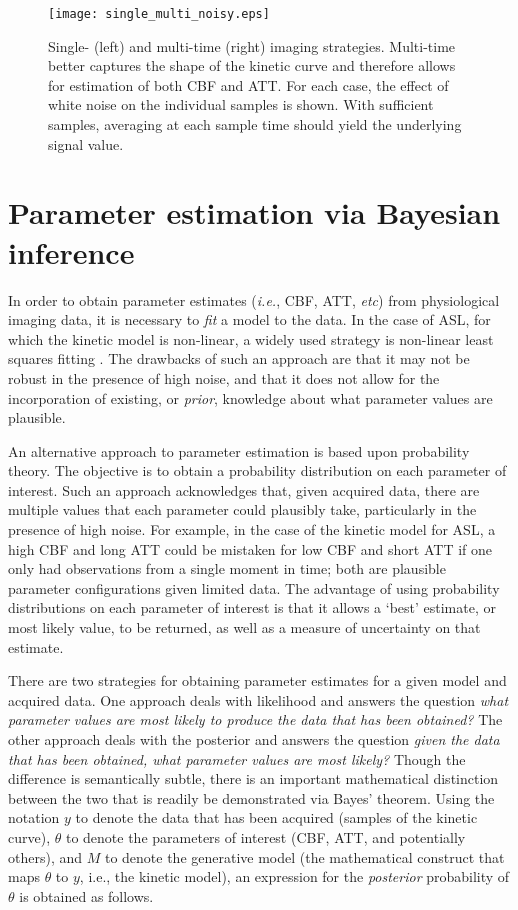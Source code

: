 \begin{figure}
\centering
\texttt{[image: single\_multi\_noisy.eps]}
\caption{Single- (left) and multi-time (right) imaging strategies. Multi-time better captures the shape of the kinetic curve and therefore allows for estimation of both CBF and ATT. For each case, the effect of white noise on the individual samples is shown. With sufficient samples, averaging at each sample time should yield the underlying signal value.}
\label{single_multi_noisy}
\end{figure}

\section{Parameter estimation via Bayesian inference}
\label{lit_vb}

In order to obtain parameter estimates (\textit{i.e.}, CBF, ATT, \textit{etc}) from physiological imaging data, it is necessary to \textit{fit} a model to the data. In the case of ASL, for which the kinetic model is non-linear, a widely used strategy is non-linear least squares fitting \cite{Chappell2009}. The drawbacks of such an approach are that it may not be robust in the presence of high noise, and that it does not allow for the incorporation of existing, or \textit{prior}, knowledge about what parameter values are plausible. 

An alternative approach to parameter estimation is based upon probability theory. The objective is to obtain a probability distribution on each parameter of interest. Such an approach acknowledges that, given acquired data, there are multiple values that each parameter could plausibly take, particularly in the presence of high noise. For example, in the case of the kinetic model for ASL, a high CBF and long ATT could be mistaken for low CBF and short ATT if one only had observations from a single moment in time; both are plausible parameter configurations given limited data. The advantage of using probability distributions on each parameter of interest is that it allows a `best' estimate, or most likely value, to be returned, as well as a measure of uncertainty on that estimate. 

There are two strategies for obtaining parameter estimates for a given model and acquired data. One approach deals with likelihood and answers the question \textit{what parameter values are most likely to produce the data that has been obtained?} The other approach deals with the posterior and answers the question \textit{given the data that has been obtained, what parameter values are most likely?} Though the difference is semantically subtle, there is an important mathematical distinction between the two that is readily be demonstrated via Bayes' theorem. Using the notation $y$ to denote the data that has been acquired (samples of the kinetic curve), $\theta$ to denote the parameters of interest (CBF, ATT, and potentially others), and $M$ to denote the generative model (the mathematical construct that maps $\theta$ to $y$, i.e., the kinetic model), an expression for the \textit{posterior} probability of $\theta$ is obtained as follows. 

